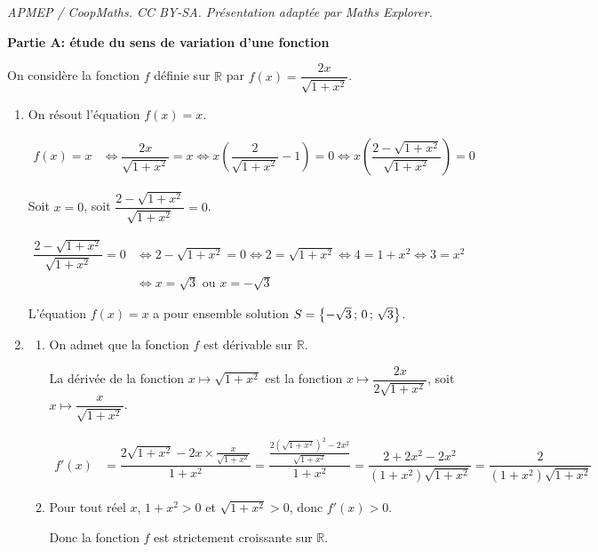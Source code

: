 \documentclass[10pt]{article}
\providecommand{\R}{\mathbb{R}}
\begin{document}
\noindent\textit{APMEP / CoopMaths. CC BY-SA. Présentation adaptée par Maths Explorer.}\par\medskip
\textbf{Partie A: étude du sens de variation d'une fonction}

\medskip

On considère la fonction $f$ définie sur $\R$ par 
$f(x) = \dfrac{2x}{\sqrt{1 + x^2}}$.

\begin{enumerate}
\item On résout l'équation $f(x) = x$.

$\begin{aligned}
f(x)=x
& \iff  \dfrac{2x}{\sqrt{1 + x^2}} =x
\iff x\left ( \dfrac{2}{\sqrt{1 + x^2}} - 1\right )=0
\iff x \left (\dfrac{2-\sqrt{1+x^2}}{\sqrt{1+x^2}}\right )=0
\end{aligned}$

Soit $x=0$, soit $\dfrac{2-\sqrt{1+x^2}}{\sqrt{1+x^2}}=0$.

$\begin{aligned}
\dfrac{2-\sqrt{1+x^2}}{\sqrt{1+x^2}}=0
& \iff 2-\sqrt{1+x^2}=0
\iff 2=\sqrt{1+x^2}
\iff 4=1+x^2
\iff 3=x^2\\
& \iff x=\sqrt{3}  \text{ ou } x=-\sqrt{3}
\end{aligned}$

L'équation $f(x)=x$ a pour ensemble solution $S=\left \{ -\sqrt{3}\,;\,0\,;\,\sqrt{3}\strut \right \}$.

\item
	\begin{enumerate}
		\item On admet que la fonction $f$ est dérivable sur $\R$.

La dérivée de la fonction $x \longmapsto \sqrt{1+x^2}$ est la fonction $x \longmapsto \dfrac{2x}{2\sqrt{1+x^2}}$, soit $x \longmapsto \dfrac{x}{\sqrt{1+x^2}}$.

$\begin{aligned}
f'(x)
& = \dfrac{2\sqrt{1+x^2} - 2x\times\frac{x}{\sqrt{1+x^2}}}{1+x^2}
= \dfrac{\frac{2\left ( \sqrt{1+x^2}\right )^2-2x^2}{\sqrt{1+x^2}}}{1+x^2}
= \dfrac{2+2x^2-2x^2}{\left (1+x^2\right ) \sqrt{1+x^2}}
= \dfrac{2}{\left (1+x^2\right ) \sqrt{1+x^2}}
\end{aligned}$


		\item 
Pour tout réel $x$, $1+x^2>0$ et $\sqrt{1+x^2}>0$, donc $f'(x)>0$.

Donc la fonction $f$ est strictement croissante sur $\R$.
	\end{enumerate}
\end{enumerate}
\end{document}
